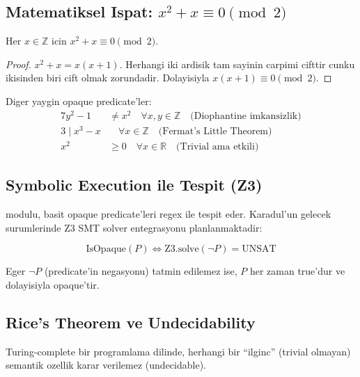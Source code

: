 \subsection{Matematiksel Ispat: $x^2 + x \equiv 0 \pmod{2}$}

\begin{theorem}
Her $x \in \mathbb{Z}$ icin $x^2 + x \equiv 0 \pmod{2}$.
\label{thm:opaque-x2x}
\end{theorem}
\begin{proof}
$x^2 + x = x(x+1)$. Herhangi iki ardisik tam sayinin carpi\-mi cifttir
cunku ikisinden biri cift olmak zorundadir. Dolayisiyla $x(x+1) \equiv 0 \pmod{2}$.
\end{proof}

Diger yaygin opaque predicate'ler:
\begin{align}
  7y^2 - 1 &\neq x^2 \quad \forall x, y \in \mathbb{Z}
    \quad \text{(Diophantine imkansizlik)} \label{eq:opaque-dioph} \\
  3 \mid x^3 - x &\quad \forall x \in \mathbb{Z}
    \quad \text{(Fermat's Little Theorem)} \label{eq:opaque-fermat} \\
  x^2 &\geq 0 \quad \forall x \in \mathbb{R}
    \quad \text{(Trivial ama etkili)} \label{eq:opaque-trivial}
\end{align}

\subsection{Symbolic Execution ile Tespit (Z3)}

 modulu, basit opaque predicate'leri regex ile
tespit eder. Karadul'un gelecek surumlerinde Z3 SMT solver entegrasyonu
planlanmaktadir:

\begin{equation}
  \text{IsOpaque}(P) \iff \text{Z3.solve}(\neg P) = \text{UNSAT}
  \label{eq:z3-opaque}
\end{equation}

Eger $\neg P$ (predicate'in negasyonu) tatmin edilemez ise, $P$ her zaman
true'dur ve dolayisiyla opaque'tir.

\subsection{Rice's Theorem ve Undecidability}

\begin{theorem}
Turing-complete bir programlama dilinde, herhangi bir ``ilginc'' (trivial
olmayan) semantik ozellik karar verilemez (undecidable).
\end{theorem}

